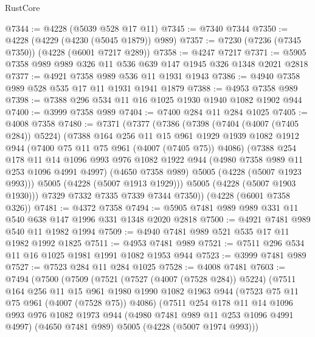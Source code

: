 \begin{lexlean}{RustCore}
\begin{coremodule}
@7344 := @4228 (@5039 @528 @17 @11)
@7345 := @7340 @7344
@7350 := @4228 (@4229 (@4230 (@5045 @1879)) @989)
@7357 := @7230 (@7236 (@7345 @7350)) (@4228 (@6001 @7217 @289))
@7358 := @4247 @7217
@7371 := @5905 @7358 @989 @989 @326 @11 @536 @639 @147 @1945 @326 @1348 @2021 @2818
@7377 := @4921 @7358 @989 @536 @11 @1931 @1943
@7386 := @4940 @7358 @989 @528 @535 @17 @11 @1931 @1941 @1879
@7388 := @4953 @7358 @989
@7398 := @7388 @296 @534 @11 @16 @1025 @1930 @1940 @1082 @1902 @944
@7400 := @3999 @7358 @989
@7404 := @7400 @284 @11 @284 @1025
@7405 := @4008 @7358
@7480 := @7371
    (@7377
      (@7386
        (@7398
          (@7404 (@4007 (@7405 @284)) @5224)
          (@7388
            @164
            @256
            @11
            @15
            @961
            @1929
            @1939
            @1082
            @1912
            @944
            (@7400 @75 @11 @75 @961 (@4007 (@7405 @75)) @4086)
            (@7388
              @254
              @178
              @11
              @14
              @1096
              @993
              @976
              @1082
              @1922
              @944
              (@4980 @7358 @989 @11 @253 @1096 @4991 @4997)
              (@4650 @7358 @989)
              @5005
              (@4228 (@5007 @1923 @993)))
            @5005
            (@4228 (@5007 @1913 @1929)))
          @5005
          (@4228 (@5007 @1903 @1930)))
        @7329
        @7332
        @7335
        @7339
        @7344
        @7350))
    (@4228 (@6001 @7358 @326))
@7481 := @4372 @7358
@7494 := @5905 @7481 @989 @989 @331 @11 @540 @638 @147 @1996 @331 @1348 @2020 @2818
@7500 := @4921 @7481 @989 @540 @11 @1982 @1994
@7509 := @4940 @7481 @989 @521 @535 @17 @11 @1982 @1992 @1825
@7511 := @4953 @7481 @989
@7521 := @7511 @296 @534 @11 @16 @1025 @1981 @1991 @1082 @1953 @944
@7523 := @3999 @7481 @989
@7527 := @7523 @284 @11 @284 @1025
@7528 := @4008 @7481
@7603 := @7494
    (@7500
      (@7509
        (@7521
          (@7527 (@4007 (@7528 @284)) @5224)
          (@7511
            @164
            @256
            @11
            @15
            @961
            @1980
            @1990
            @1082
            @1963
            @944
            (@7523 @75 @11 @75 @961 (@4007 (@7528 @75)) @4086)
            (@7511
              @254
              @178
              @11
              @14
              @1096
              @993
              @976
              @1082
              @1973
              @944
              (@4980 @7481 @989 @11 @253 @1096 @4991 @4997)
              (@4650 @7481 @989)
              @5005
              (@4228 (@5007 @1974 @993)))

\end{coremodule}
\end{lexlean}
